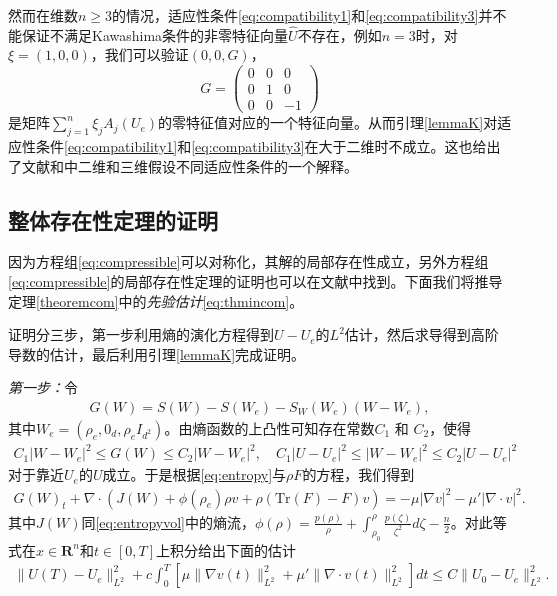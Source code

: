 \begin{remark}
然而在维数$n \ge 3$的情况，适应性条件\eqref{eq:compatibility1}和\eqref{eq:compatibility3}并不能保证不满足Kawashima条件的非零特征向量$\hat{U}$不存在，例如$n=3$时，对$\xi = (1,0,0)$，我们可以验证$(0,0, G)$，
 $$
 G = \left( \begin{array}{ccc}
 0 & 0 & 0 \\
 0 & 1 & 0 \\
 0 & 0 & -1 \end{array} \right)
 $$
是矩阵$ \sum_{j=1}^n \xi_j A_j(U_e)$的零特征值对应的一个特征向量。从而引理\ref{lemmaK}对适应性条件\eqref{eq:compatibility1}和\eqref{eq:compatibility3}在大于二维时不成立。这也给出了文献\cite{lin2005hydrodynamics}和\cite{liu2008global}中二维和三维假设不同适应性条件的一个解释。
\end{remark}

\subsection{整体存在性定理的证明}
因为方程组\eqref{eq:compressible}可以对称化，其解的局部存在性成立\cite{kawashima1984systems}，另外方程组\eqref{eq:compressible}的局部存在性定理的证明也可以在文献\cite{lin2005hydrodynamics,lei2008global,hu2013global}中找到。下面我们将推导定理\ref{theoremcom}中的\emph{先验估计}\eqref{eq:thmincom}。

证明分三步，第一步利用熵的演化方程得到$U-U_e$的$L^2$估计，然后求导得到高阶导数的估计，最后利用引理\ref{lemmaK}完成证明。

\emph{第一步：}令
\begin{eqnarray*}
  G(W) = S(W) - S(W_e) - S_W(W_e) (W-W_e),
\end{eqnarray*}
其中$W_e = (\rho_e, 0_d, \rho_e I_{d^2})$。由熵函数的上凸性可知存在常数$C_1$ 和 $C_2$，使得
\begin{eqnarray*}
  C_1 |W-W_e|^2 \le G(W) \le C_2 |W-W_e|^2, \quad C_1 |U-U_e|^2 \le |W-W_e|^2 \le C_2 |U-U_e|^2
\end{eqnarray*}
对于靠近$U_e$的$U$成立。于是根据\eqref{eq:entropy}与$\rho F$的方程，我们得到
\begin{eqnarray*}
  G(W)_t + \nabla \cdot (J(W) + \phi(\rho_e) \rho  v  + \rho (\mbox{Tr}(F) - F) v ) = -\mu |\nabla  v |^2 - \mu' |\nabla \cdot  v |^2.
\end{eqnarray*}
其中$J(W)$同\eqref{eq:entropyvol}中的熵流，$\phi(\rho) = \frac{p(\rho)}{\rho} + \int_{\rho_0}^{\rho}\frac{p(\zeta)}{\zeta^2}d\zeta - \frac{n}{2}$。对此等式在$x\in\mathbf{R}^n$和$t\in[0, T]$上积分给出下面的估计
\begin{eqnarray}\label{eq:EnergyESTcom}
  \|U(T) - U_e\|_{L^2}^2 + c \int_0^T[ \mu \|\nabla v (t)\|_{L^2}^2 +  \mu' \|\nabla \cdot  v (t)\|_{L^2}^2] dt
  \le C\|U_0-U_e\|_{L^2}^2 .
\end{eqnarray}

